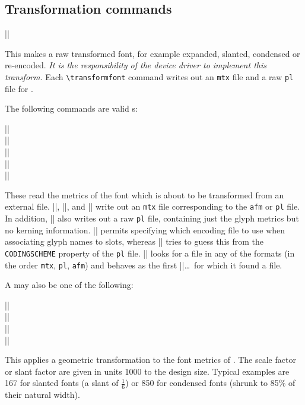 \documentclass[a4paper]{ltxguide}
\makeatletter
\newenvironment{decl*}[1][]{%
   \par
   \small
   \addvspace{2.3ex}%
   \vskip -\parskip
   \ifx\relax#1\relax
      \def\@decl@date{}%
   \else
      \def\@decl@date{\NEWfeature{#1}}%
   \fi
   \noindent\hspace{-\leftmargini}%
   \begin{tabular}{|l|}%
      \hline\ignorespaces
}{%
      \\\hline
   \end{tabular}%
   \nobreak\@decl@date\par\nobreak
   \vspace{2.3ex}\vskip -\parskip
}
\newcommand*{\marg}{\arg}
\newcommand*{\setfilename}[1]{\texttt{#1}}
\newcommand{\pl} {\setfilename{pl}\xspace}
\newcommand{\afm}{\setfilename{afm}\xspace}
\newcommand{\mtx}{\setfilename{mtx}\xspace}
\makeatother
\begin{document}
\subsection{Transformation commands}


\begin{decl}
  |\transformfont|
\end{decl}
This makes a raw transformed font, for example expanded, slanted,
condensed or re-encoded.  \emph{It is the responsibility of the device
  driver to implement this transform.}  Each \verb|\transformfont|
command writes out an \mtx file and a raw \pl file for .

The following commands are valid s:
\begin{decl*}
  |\fromafm|\\
  |\fromany|\\
  |\frompl|\\
  |\fromplgivenetx|\marg{pl}\marg{etx}\\
  |\frommtx|
\end{decl*}
These read the metrics of the font which is about to be transformed from
an external file. |\fromafm|, |\frompl|, and |\fromplgivenetx| write out 
an \mtx file corresponding to the \afm or \pl file.  In addition, 
|\fromafm| also writes out a raw \pl file, containing just the glyph 
metrics but no kerning information. |\fromplgivenetx| permits 
specifying which encoding file to use when associating glyph names to 
slots, whereas |\frompl| tries to guess this from the 
\texttt{CODINGSCHEME} property of the \pl file. |\fromany| looks for 
a file in any of the formats (in the order \mtx, \pl, \afm) and 
behaves as the first |\from|\dots\ for which it found a file.

A  may also be one of the following:
\begin{decl*}
  |\scalefont|\\
  |\xscalefont|\\
  |\yscalefont|\\
  |\slantfont|
\end{decl*}
This applies a geometric transformation to the font metrics of
.  The scale factor or slant factor are given in
units 1000 to the design size.  Typical examples are 167 for slanted
fonts (a slant of $\frac{1}{6}$) or 850 for condensed fonts (shrunk 
to 85\% of their natural width).
\end{document}
